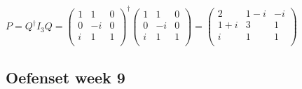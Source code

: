 \begin{oefening}[4.2.4]
    \(P = Q^\dagger I_3 Q = 
    \begin{pmatrix}
        1 & 1 & 0\\
        0 & -i & 0 \\
        i & 1 & 1\\
    \end{pmatrix}^\dagger
    \begin{pmatrix}
        1 & 1 & 0\\
        0 & -i & 0 \\
        i & 1 & 1\\
    \end{pmatrix}
    = 
     \begin{pmatrix}
        2 & 1-i & -i\\
        1+i & 3 & 1 \\
        i & 1 & 1\\
    \end{pmatrix}
    \)
\end{oefening}

\subsection{Oefenset week 9}

